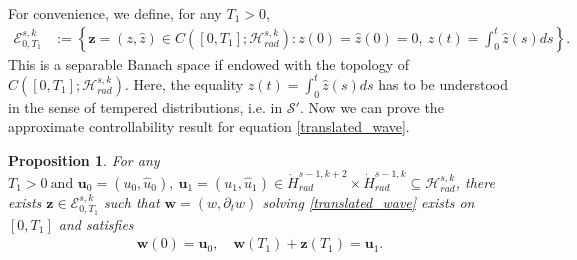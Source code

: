 \documentclass[12pt,reqno]{amsart}
\theoremstyle{plain}
\theoremstyle{remark}
\theoremstyle{plain}
\newtheorem{proposition}[theorem]{Proposition}
\theoremstyle{definition}
\numberwithin{equation}{section}
\numberwithin{equation}{section}
\newcommand{\HH}{\mathcal{H}}
\begin{document}
	For convenience, we define, for any $T_1>0$,
	\begin{align*}
		\mathcal{E}^{s,k}_{0,T_1}&:=\left\{\mathbf{z}=(z,\hat z)\in C([0,T_1];\HH_{rad}^{s,k}): z(0)=\hat{z}(0)=0,\ z(t)=\int_0^t \hat{z}(s)ds \right\}.
	\end{align*}
	This is a separable Banach space if endowed with the topology of $C([0,T_1];\HH_{rad}^{s,k})$. Here, the equality $z(t)=\int_0^t \hat{z}(s)ds$ has to be understood in the sense of tempered distributions, i.e. in $\mathscr{S}'$. 
	Now we can prove the approximate controllability result for equation \eqref{translated_wave}.
	\begin{proposition}\label{prop_aux_control}
		For any $T_1>0\ \text{and } \mathbf{u}_0=(u_0,\hat{u}_0),\ \mathbf{u}_1=(u_1,\hat{u}_1)\in \dot{H}^{s-1,k+2}_{rad}\times \dot{H}^{s-1,k}_{rad}\subseteq \HH_{rad}^{s,k}$, there exists $\mathbf{z}\in \mathcal{E}^{s,k}_{0,T_1}$ such that $\mathbf{w}=(w,\partial_t w)$ solving \eqref{translated_wave} exists on $[0,T_1]$ and satisfies \begin{align*}
			\mathbf{w}(0)=\mathbf{u}_0,\quad
			\mathbf{w}(T_1)+\mathbf{z}(T_1)=\mathbf{u}_1.
		\end{align*}
	\end{proposition}
\end{document}
